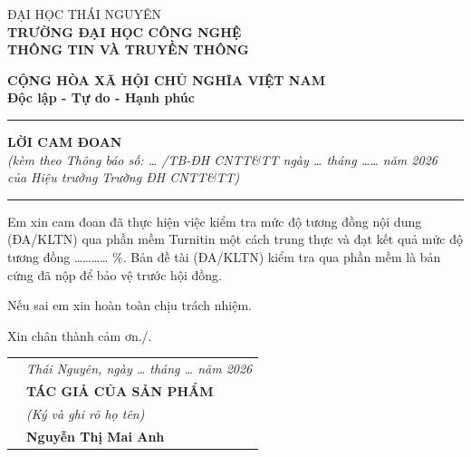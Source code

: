 \documentclass[../main.tex]{subfiles}
\begin{document}
\noindent
\begin{minipage}[t]{0.45\textwidth}
\centering
ĐẠI HỌC THÁI NGUYÊN \\
\textbf{TRƯỜNG ĐẠI HỌC CÔNG NGHỆ} \\
\textbf{THÔNG TIN VÀ TRUYỀN THÔNG}
\end{minipage}%
\begin{minipage}[t]{0.55\textwidth}
\centering
\textbf{CỘNG HÒA XÃ HỘI CHỦ NGHĨA VIỆT NAM} \\
\textbf{Độc lập - Tự do - Hạnh phúc} \\
\rule{0.6\linewidth}{0.4pt}
\end{minipage}

\vspace{1cm}

\begin{center}
\textbf{LỜI CAM ĐOAN}\\[0.3cm]
\textit{(kèm theo Thông báo số: \ldots{} /TB-ĐH CNTT\&TT ngày \ldots{} tháng \ldots\ldots{} năm 2026}\\
\textit{của Hiệu trưởng Trường ĐH CNTT\&TT)}\\[0.1cm]
\rule{0.4\textwidth}{0.4pt}
\end{center}

\vspace{0.5cm}

\hspace{1cm} Em xin cam đoan đã thực hiện việc kiểm tra mức độ tương đồng nội dung (ĐA/KLTN) qua phần mềm Turnitin một cách trung thực và đạt kết quả mức độ tương đồng \ldots\ldots\ldots\ldots{} \%. Bản đề tài (ĐA/KLTN) kiểm tra qua phần mềm là bản cứng đã nộp để bảo vệ trước hội đồng.

\hspace{1cm} Nếu sai em xin hoàn toàn chịu trách nhiệm.

\hspace{1cm} Xin chân thành cảm ơn./.

\vspace{1cm}

\begin{tabular}{p{} >{\centering\arraybackslash}p{}}
 & \textit{Thái Nguyên, ngày \ldots{} tháng \ldots{} năm 2026} \\[0.5cm]
 & \textbf{TÁC GIẢ CỦA SẢN PHẨM} \\
 & \textit{(Ký và ghi rõ họ tên)} \\[2.5cm]
 & \textbf{Nguyễn Thị Mai Anh} \\
\end{tabular}
\end{document}
